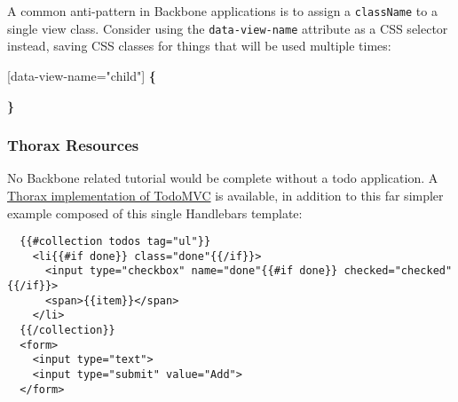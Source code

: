 \documentclass[9pt]{book}
\newenvironment{Shaded}{}{}
\newcommand{\KeywordTok}[1]{\textcolor[rgb]{0.00,0.44,0.13}{\textbf{{#1}}}}
\newcommand{\DataTypeTok}[1]{\textcolor[rgb]{0.56,0.13,0.00}{{#1}}}
\newcommand{\CharTok}[1]{\textcolor[rgb]{0.25,0.44,0.63}{{#1}}}
\newcommand{\StringTok}[1]{\textcolor[rgb]{0.25,0.44,0.63}{{#1}}}
\newcommand{\OtherTok}[1]{\textcolor[rgb]{0.00,0.44,0.13}{{#1}}}
\newcommand{\FunctionTok}[1]{\textcolor[rgb]{0.02,0.16,0.49}{{#1}}}
\newcommand{\NormalTok}[1]{{#1}}
\begin{document}
\begin{Shaded}
\end{Shaded}

A common anti-pattern in Backbone applications is to assign a
\texttt{className} to a single view class. Consider using the
\texttt{data-view-name} attribute as a CSS selector instead, saving CSS
classes for things that will be used multiple times:

\begin{Shaded}
\begin{Highlighting}[]
  \CharTok{[data-view-name=}\StringTok{"child"}\CharTok{]} \KeywordTok{\{}

  \KeywordTok{\}}
\end{Highlighting}
\end{Shaded}

\subsubsection{Thorax Resources}\label{thorax-resources}

No Backbone related tutorial would be complete without a todo
application. A
\href{http://todomvc.com/labs/architecture-examples/thorax/}{Thorax
implementation of TodoMVC} is available, in addition to this far simpler
example composed of this single Handlebars template:

\begin{verbatim}
  {{#collection todos tag="ul"}}
    <li{{#if done}} class="done"{{/if}}>
      <input type="checkbox" name="done"{{#if done}} checked="checked"{{/if}}>
      <span>{{item}}</span>
    </li>
  {{/collection}}
  <form>
    <input type="text">
    <input type="submit" value="Add">
  </form>
\end{verbatim}
\end{document}
